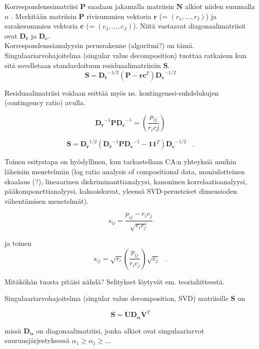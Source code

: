 \documentclass[12pt,a4paper,leqno]{article}
\theoremstyle{plain}
\theoremstyle{definition}
\theoremstyle{remark}
\begin{document}
Korrespondenssimatriisi  $\boldsymbol{P}$ saadaan jakamalla matriisin $\boldsymbol{N}$  alkiot niiden summalla $n$ . 
Merkitään matriisin  $\boldsymbol{P}$  rivisummien vektoria $\boldsymbol{r}$ (= $(r_{1}, \dots, r_{I})$) ja sarakesummien vektoria $\boldsymbol{c}$ (=
$(c_{1}, \dots, c_{J})$).  Niitä vastaavat diagonaalimatriisit ovat $\boldsymbol{D_r}$ ja $\boldsymbol{D_c}$. \\

Korrespondenssianalyysin perusrakenne (algoritmi?) on tämä. Singulaariarvohajoitelma (singular value decomposition) tuottaa ratkaisun kun sitä sovelletaan standardoituun residuaalimatriisiin $\boldsymbol{S}$. 
\begin{equation}
\boldsymbol{S} = \boldsymbol{D_r}^{-1/2}(\boldsymbol{P} - \boldsymbol{r}\boldsymbol{c}^T)\boldsymbol{D_c}^{-1/2} \label{A}
\end{equation}

Residuaalimatriisi voidaan esittää myös ns. kontingenssi-suhdelukujen (contingency ratio) avulla.

\[
\boldsymbol{D_r}^{-1} \boldsymbol{P} \boldsymbol{D_c}^{-1} = \left( \frac{p_{ij}} {r_{i} c{j}} \right)
\]

\[ 
\boldsymbol{S} = \boldsymbol{D_r}^{1/2} (\boldsymbol{D_r}^{-1} \boldsymbol{P} \boldsymbol{D_c}^{-1} - \boldsymbol{1}\boldsymbol{1}^{T} ) \boldsymbol{D_c}^{-1/2}  \;\;\; .
\]

Toinen esitystapa on hyödyllinen, kun tarkastellaan CA:n yhteyksiä muihin läheisiin menetelmiin (log ratio analysis of compositional data, moniulotteinen skaalaus (?), lineaarinen diskriminanttianalyysi, kanoninen korrelaatioanalyysi, pääkomponettianalyysi, kaksoiskuvat, yleensä SVD-perusteiset dimensioden vähentämisen menetelmät).

 
\[
s_{ij} = \frac{p_{ij}-r_{i}c_{j}} { \sqrt{r_{i}c_{j} } }
\]

ja toinen
\[
s_{ij} = \sqrt{r_{i}} \left( \frac{p_{ij}}{r_{i}c_{j}} \right) \sqrt{c_{j}} \;\;\; .
\]

Mitäköhän tuosta pitäisi nähdä? Selitykset löytyvät em. teorialiitteestä.

Singulaariarvohajoitelma (singular value decomposition, SVD) matriisille $\boldsymbol{S}$ on

\[ 
\boldsymbol{S} = \boldsymbol{U} \boldsymbol{D_{\alpha}} \boldsymbol{V}^{T}
\]

missä $\boldsymbol{D_{\alpha}}$ on diagonaalimatriisi, jonka alkiot ovat singulaariarvot suuruusjärjestyksessä $\alpha_{1}\geq \alpha_{1} \geq \hdots$
\end{document}
